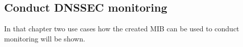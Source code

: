 \subsection{Conduct DNSSEC monitoring}
\label{section:conduct-dnssec-monitoring}
In that chapter two use cases how the created MIB can be used to conduct monitoring will be shown. 


